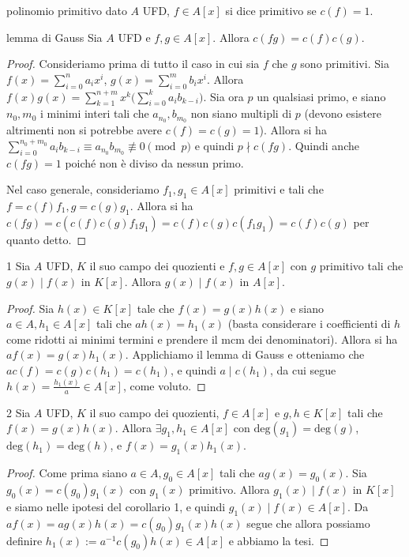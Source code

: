 \begin{definition}{polinomio primitivo}
    dato $A$ UFD, $f  \in A[x]$ si dice primitivo se $c(f) = 1$.
\end{definition}
\begin{theorem}{lemma di Gauss}
    Sia $A$ UFD e $f,g \in A[x]$. Allora $c(fg) = c(f)c(g)$.
\end{theorem}
\begin{proof}
    Consideriamo prima di tutto il caso in cui sia $f$ che $g$ sono primitivi. Sia $f(x) = \sum_{i=0}^n a_i x^i$, $g(x) = \sum_{i=0}^m b_ix^i$. Allora $f(x)g(x) = \sum_{k=1}^{n+m} x^k\big( \sum_{i = 0}^k a_ib_{k-i} \big)$. Sia ora $p$ un qualsiasi primo, e siano $n_0,m_0$ i minimi interi tali che $a_{n_0}, b_{m_0}$ non siano multipli di $p$ (devono esistere altrimenti non si potrebbe avere $c(f)= c(g) = 1$). Allora si ha $\sum_{i = 0}^{n_0+m_0} a_ib_{k-i} \equiv a_{n_0}b_{m_0} \not \equiv 0 \pmod{p}$ e quindi $p \nmid c(fg)$. Quindi anche $c(fg)=1$ poiché non è diviso da nessun primo.
    
    Nel caso generale, consideriamo $f_1, g_1 \in A[x]$ primitivi e tali che $f = c(f)f_1, g = c(g)g_1$. Allora si ha $c(fg) = c(c(f)c(g)f_1g_1) = c(f)c(g)c(f_1g_1) = c(f)c(g)$ per quanto detto.
\end{proof}
\begin{corollary}{1}
    Sia $A$ UFD, $K$ il suo campo dei quozienti e $f,g \in A[x]$ con $g$ primitivo tali che $g(x) \mid f(x)$ in $K[x]$. Allora $g(x) \mid f(x)$ in $A[x]$.
\end{corollary}
\begin{proof}
    Sia $h(x) \in K[x]$ tale che $f(x) = g(x)h(x)$ e siano $a \in A, h_1 \in A[x]$ tali che $ah(x) = h_1(x)$ (basta considerare i coefficienti di $h$ come ridotti ai minimi termini e prendere il mcm dei denominatori). Allora si ha $af(x) = g(x)h_1(x)$. Applichiamo il lemma di Gauss e otteniamo che $ac(f) = c(g)c(h_1) = c(h_1)$, e quindi $a \mid c(h_1)$, da cui segue $h(x) = \frac{h_1(x)}{a} \in A[x]$, come voluto.
\end{proof}
\begin{corollary}{2}
    Sia $A$ UFD, $K$ il suo campo dei quozienti, $f \in A[x]$ e $g,h \in K[x]$ tali che $f(x) = g(x)h(x)$. Allora $\exists g_1, h_1 \in A[x]$ con $\text{deg}(g_1) = \text{deg}(g)$, $\text{deg}(h_1) = \text{deg}(h)$, e $f(x) = g_1(x)h_1(x)$.
\end{corollary}
\begin{proof}
    Come prima siano $a\in A, g_0 \in A[x]$ tali che $ag(x) = g_0(x)$. Sia $g_0(x) = c(g_0)g_1(x)$ con $g_1(x)$ primitivo. Allora $g_1(x) \mid f(x)$  in $K[x]$ e siamo nelle ipotesi del corollario 1, e quindi $g_1(x) \mid f(x) \in A[x]$. Da $af(x) = ag(x)h(x) = c(g_0)g_1(x)h(x)$ segue che allora possiamo definire $h_1(x) := a^{-1}c(g_0)h(x) \in A[x]$ e abbiamo la tesi.
\end{proof}
